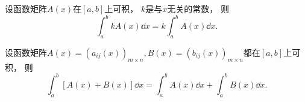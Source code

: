 \begin{property}
设函数矩阵\(A(x)\)在\([a,b]\)上可积，
\(k\)是与\(x\)无关的常数，
则\begin{equation*}
	\int_a^b k A(x) \dd{x}
	= k \int_a^b A(x) \dd{x}.
\end{equation*}
\end{property}

\begin{property}
设函数矩阵\(
	A(x) = (a_{ij}(x))_{m \times n},
	B(x) = (b_{ij}(x))_{m \times n}
\)都在\([a,b]\)上可积，
则\begin{equation*}
	\int_a^b [ A(x) + B(x) ] \dd{x}
	= \int_a^b A(x) \dd{x}
	+ \int_a^b B(x) \dd{x}.
\end{equation*}
\end{property}
